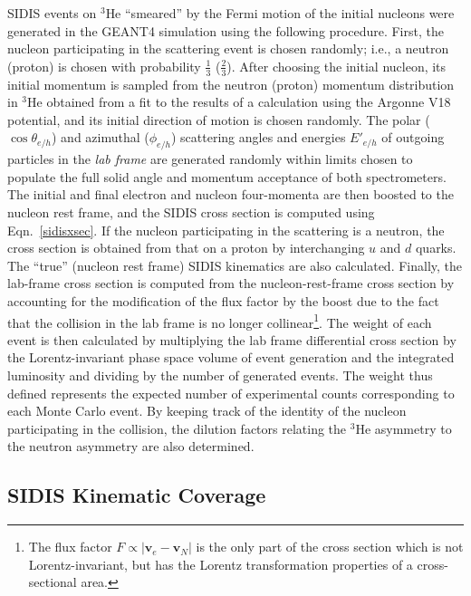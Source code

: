 SIDIS events on $^3$He ``smeared'' by the Fermi motion of the initial nucleons were generated in the GEANT4 simulation using the following procedure. First, the nucleon participating in the scattering event is chosen randomly; i.e., a neutron (proton) is chosen with probability $\frac{1}{3}$ ($\frac{2}{3}$). After choosing the initial nucleon, its initial momentum is sampled from the neutron (proton) momentum distribution in $^3$He obtained from a fit to the results of a calculation using the Argonne V18 potential, and its initial direction of motion is chosen randomly. The polar ($\cos \theta_{e/h}$) and azimuthal ($\phi_{e/h}$) scattering angles and energies $E'_{e/h}$ of outgoing particles in the \emph{lab frame} are generated randomly within limits chosen to populate the full solid angle and momentum acceptance of both spectrometers. The initial and final electron and nucleon four-momenta are then boosted to the nucleon rest frame, and the SIDIS cross section is computed using Eqn.~\eqref{sidisxsec}. If the nucleon participating in the scattering is a neutron, the cross section is obtained from that on a proton by interchanging $u$ and $d$ quarks. The ``true'' (nucleon rest frame) SIDIS kinematics are also calculated. Finally, the lab-frame cross section is computed from the nucleon-rest-frame cross section by accounting for the modification of the flux factor by the boost due to the fact that the collision in the lab frame is no longer collinear\footnote{The flux factor $F \propto \left| \mathbf{v}_e - \mathbf{v}_N\right|$ is the only part of the cross section which is not Lorentz-invariant, but has the Lorentz transformation properties of a cross-sectional area.}. The weight of each event is then calculated by multiplying the lab frame differential cross section by the Lorentz-invariant phase space volume of event generation and the integrated luminosity and dividing by the number of generated events. The weight thus defined represents the expected number of experimental counts corresponding to each Monte Carlo event. By keeping track of the identity of the nucleon participating in the collision, the dilution factors relating the $^3$He asymmetry to the neutron asymmetry are also determined. 
\subsection{SIDIS Kinematic Coverage}


